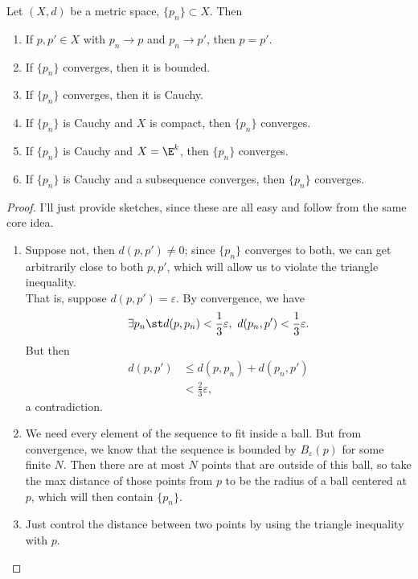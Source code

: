 \documentclass{notes}
\begin{document}
\begin{theorem}
  Let $(X,d)$ be a metric space, $\{p_n\} \subset X$. Then
  \begin{enumerate}
    \item If $p, p' \in X$ with $p_n \to p$ and $p_n \to p'$, then $p = p'$.
    \item If $\{p_n\}$ converges, then it is bounded.
    \item If $\{p_n\}$ converges, then it is Cauchy.
    \item If $\{p_n\}$ is Cauchy and $X$ is compact, then $\{p_n\}$ converges.
    \item If $\{p_n\}$ is Cauchy and $X = \E^k$, then $\{p_n\}$ converges.
    \item If $\{p_n\}$ is Cauchy and a subsequence converges, then $\{p_n\}$ converges.
  \end{enumerate}
\end{theorem}
\begin{proof}
  I'll just provide sketches, since these are all easy and follow from the same core idea.
  \begin{enumerate}
  \item Suppose not, then $d(p, p') \neq 0$; since $\{p_n\}$ converges to both, we can get arbitrarily
  close to both $p, p'$, which will allow us to violate the triangle inequality. \\

  That is, suppose $d(p,p') = \varepsilon$. By convergence, we have $$\exists p_n \st d(p, p_n) < 
  \frac{1}{3} \varepsilon,\ d(p_n, p') < \frac{1}{3}\varepsilon.$$ But then
  \begin{align*}
    d(p, p') &\leq d(p, p_n) + d(p_n, p') \\\
             &< \frac{2}{3}\varepsilon,
  \end{align*}
  a contradiction.
  \item We need every element of the sequence to fit inside a ball. But from convergence, we know that
    the sequence is bounded by $B_\varepsilon(p)$ for some finite $N$. Then there are at most $N$ points
    that are outside of this ball, so take the max distance of those points from $p$ to be the radius
    of a ball centered at $p$, which will then contain $\{p_n\}$.
  \item Just control the distance between two points by using the triangle inequality with $p$.
  \end{enumerate} 
\end{proof}
\end{document}
